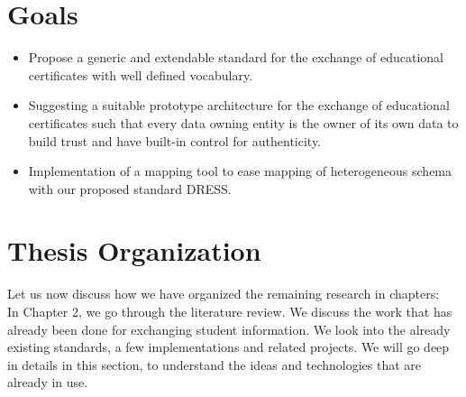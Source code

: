 \documentclass[12pt,a4paper,oneside]{book}
\begin{document}



\section{Goals}\label{s-goals}

\begin{itemize}
\item
Propose a generic and extendable standard for the exchange of educational certificates with well defined vocabulary.
\item
Suggesting a suitable prototype architecture for the exchange of educational certificates such that 
every data owning entity is the owner of its own data to build trust and have built-in control for authenticity.
\item
Implementation of a mapping tool to ease mapping of heterogeneous schema with our proposed standard DRESS.
\end{itemize}



\section{Thesis Organization}\label{s-thesis-organization}

Let us now discuss how we have organized the remaining research in chapters: \\

In Chapter 2, we go through the literature review. We discuss the work that has already been done for exchanging student information. We look into the already existing standards, a few implementations and related projects. We will go deep in details in this section, to understand the ideas and technologies that are already in use. \\
\end{document}
